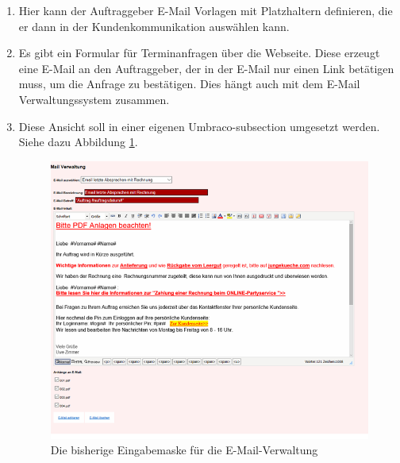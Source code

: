 \begin{enumerate}
	\item Hier kann der Auftraggeber E-Mail Vorlagen mit Platzhaltern definieren, die er dann in der Kundenkommunikation auswählen kann.
	\item Es gibt ein Formular für Terminanfragen über die Webseite. Diese erzeugt eine E-Mail an den Auftraggeber, der in der E-Mail nur einen Link betätigen muss, um die Anfrage zu bestätigen. Dies hängt auch mit dem E-Mail Verwaltungssystem zusammen.
	\item Diese Ansicht soll in einer eigenen Umbraco-subsection umgesetzt werden.
	Siehe dazu Abbildung \ref{fig:email}.
	
	\begin{figure}[h]
	\centering
	\includegraphics[width=0.5\linewidth]{Graphics/email.png}
	\caption[E-Mail-Verwaltung]{Die bisherige Eingabemaske für die E-Mail-Verwaltung}
	\label{fig:email}
\end{figure}
\end{enumerate} 



